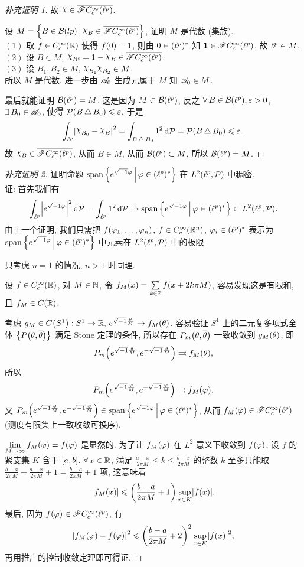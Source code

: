 \begin{proof}[补充证明 1]
故 $\rchi\in\mean{\SF\cci\xk{\lp}}$.\par
设 $M=\jh{B\in\BB\xk{lp}}{\rchi_{B}\in\mean{\SF\cci\xk{\lp}}}$, 证明 $M$ 是代数 (集族).\\
$(1)$ 取 $f\in\cci\xk{\rr}$ 使得 $f\xk{0}=1$, 则由 $0\in(\ell^p)^*$ 知 $\mathbf{1}\in\SF\cci\xk{\lp}$, 故 $\ell^p\in M$.\\
$(2)$ 设 $B\in M$, $\rchi_{B\bu}=1-\rchi_{B}\in\mean{\SF\cci\xk{\lp}}$.\\
$(3)$ 设 $B_{1},B_{2}\in M$, $\rchi_{B_{1}}\rchi_{B_{2}}\in M$.\\
所以 $M$ 是代数. 进一步由 $\mathscr{A}_{0}$ 生成元属于 $M$ 知 $\mathscr{A}_{0}\in M$.\par 
最后就能证明 $\BB\xk{\lp}=M$. 这是因为 $M\subset\BB\xk{\lp}$, 反之 $\forall B\in\BB\xk{\lp},\eps>0$, $\exists B_{0}\in\SA_{0}$, 使得 $\PP\xk{B\sj B_{0}}\leq\eps$, 于是
\[\int_{\lp}\jd{\rchi_{B_{0}}-\rchi_{B}}^{2}=\int_{B\sj B_{0}}1^{2}\dd\PP=\PP\xk{B\sj B_{0}}\leq\eps.\]
故 $\rchi_{B}\in\mean{\SF\cci\xk{\lp}}$, 从而 $B\in M$, 从而 $\BB\xk{\lp}\subset M$, 所以 $\BB\xk{\lp}=M$.
\end{proof}
\begin{proof}[补充证明 2]
证明命题 $\mathrm{span}\left\{e^{\sqrt{\smash{-}1}\varphi}\,\middle\vert\,\varphi\in(\ell^p)^*\right\}$ 在 $L^{2}\xk{\lp,\PP}$ 中稠密.\\
证: 首先我们有
\[\int_{\lp}\jd{e^{\xs\phi}}^{2}\dd\PP=\int_{\lp}1^{2}\dd\PP\Rightarrow \Span\jh{e^{\xs\phi}}{\phi\in\colp}\subset L^{2}\xk{\lp,\PP}.\]
由上一个证明, 我们只需把 $f\xk{\phi_{1},\dots,\phi_{n}}$, $f\in\cci\xk{\rr^{n}}$, $\varphi_{i}\in(\ell^p)^*$ 表示为\\
$\mathrm{span}\left\{e^{\sqrt{\smash{-}1}\varphi}\,\middle\vert\,\varphi\in(\ell^p)^*\right\}$ 中元素在 $L^{2}\xk{\lp,\PP}$ 中的极限.\par 
只考虑 $n=1$ 的情况, $n>1$ 时同理.\par 
设 $f\in\cci\xk{\rr}$, 对 $M\in\mathbb{N}$, 令 $f_{M}\xk{x}=\sum\limits_{k\in\zz}f\xk{x+2k\pi M}$, 容易发现这是有限和, 且 $f_{M}\in C\xk{\rr}$.\par 
考虑 $g_{M}\in C\xk{S^1}:S^{1}\to\rr,\,e^{\xs\frac{\theta}{M}}\to f_{M}\xk{\theta}$. 容易验证 $S^{1}$ 上的二元复多项式全体 $\dk{P\xk{\theta,\mean{\theta}}}$ 满足 Stone 定理的条件, 所以存在 $P_{m}\xk{\theta,\mean{\theta}}$ 一致收敛到 $g_{M}\xk{\theta}$, 即
\[P_{m}\xk{e^{\xs\frac{\theta}{M}},e^{-\xs\frac{\theta}{M}}}\rightrightarrows f_{M}\xk{\theta},\]
所以
\[P_{m}\xk{e^{\xs\frac{\phi}{M}},e^{-\xs\frac{\phi}{M}}}\rightrightarrows f_{M}\xk{\phi}.\]
又 $P_{m}\xk{e^{\xs\frac{\phi}{M}},e^{-\xs\frac{\phi}{M}}}\in\Span\jh{e^{\xs\phi}}{\phi\in\colp}$, 从而 $f_{M}\xk{\phi}\in\SF\cci\xk{\lp}$ (测度有限集上一致收敛可换序).\par 
$\lim\limits_{M\toi}f_{M}\xk{\phi}=f\xk{\phi}$ 是显然的. 为了让 $f_{M}\xk{\phi}$ 在 $L^{2}$ 意义下收敛到 $f\xk{\phi}$, 设 $f$ 的紧支集 $K$ 含于 $\left[a,b\right]$. $\forall x\in\rr$, 满足 $\frac{a-x}{2\pi M}\leq k\leq \frac{b-x}{2\pi M}$ 的整数 $k$ 至多只能取 $\frac{b-x}{2\pi M}-\frac{a-x}{2\pi M}+1=\frac{b-a}{2\pi M}+1$ 项, 这意味着
\[\jd{f_{M}\xk{x}}\leq\xk{\frac{b-a}{2\pi M}+1}\sup _{x\in K}\jd{f\xk{x}}.\]
最后, 因为 $f\xk{\phi}\in\SF\cci\xk{\lp}$, 有
\[\jd{f_{M}\xk{\phi}-f\xk{\phi}}^{2}\leq\xk{\frac{b-a}{2\pi M}+2}^{2}
\sup_{x\in K}\jd{f\xk{x}}^{2},\]
再用推广的控制收敛定理即可得证.
\end{proof}

